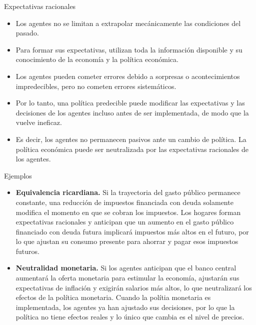 \documentclass[aspectratio=169,11pt]{beamer}
\begin{document}
\begin{frame}{Expectativas racionales}
  \begin{itemize}
    \setlength{\itemsep}{0.55em}

    \item Los agentes no se limitan a extrapolar mecánicamente las condiciones del pasado.

    \item Para formar sus expectativas, utilizan toda la información disponible y su conocimiento de la economía y la política económica.

    \item Los agentes pueden cometer errores debido a sorpresas o acontecimientos impredecibles, pero no cometen errores sistemáticos.

    \item Por lo tanto, una política predecible puede modificar las expectativas y las decisiones de los agentes incluso antes de ser implementada, de modo que la vuelve ineficaz.
    
    \item Es decir, los agentes no permanecen pasivos ante un cambio de política. La política económica puede ser neutralizada por las expectativas racionales de los agentes.
  \end{itemize}
\end{frame}


\begin{frame}{Ejemplos}
  \small
\begin{itemize}
    \item \textbf{Equivalencia ricardiana.} Si la trayectoria del gasto público permanece constante, una reducción de impuestos financiada con deuda solamente modifica el momento en que se cobran los impuestos. Los hogares forman expectativas racionales y anticipan que un aumento en el gasto público financiado con deuda futura implicará impuestos más altos en el futuro, por lo que ajustan su consumo presente para ahorrar y pagar esos impuestos futuros.

    \item \textbf{Neutralidad monetaria.} Si los agentes anticipan que el banco central aumentará la oferta monetaria para estimular la economía, ajustarán sus expectativas de inflación y exigirán salarios más altos, lo que neutralizará los efectos de la política monetaria. Cuando la polítia monetaria es implementada, los agentes ya han ajustado sus decisiones, por lo que la política no tiene efectos reales y lo único que cambia es el nivel de precios.
\end{itemize}
\end{frame}
\end{document}
